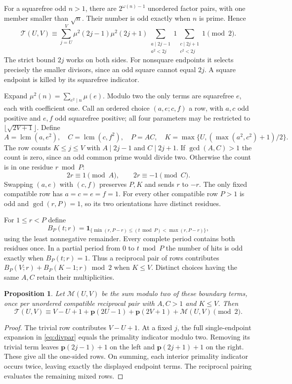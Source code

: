 \documentclass[11pt]{article}
\newtheorem{proposition}[theorem]{Proposition}
\begin{document}
For a squarefree odd $n>1$, there are $2^{\omega(n)-1}$ unordered
factor pairs, with one member smaller than $\sqrt n$.
Their number is odd exactly when $n$ is prime. Hence
\begin{equation}\label{eq:divpar}
 \mathcal T(U,V)\equiv\sum_{j=U}^V\mu^2(2j-1)\mu^2(2j+1)
 \sum_{\substack{a\mid 2j-1\\a^2<2j}}1
 \sum_{\substack{c\mid 2j+1\\c^2<2j}}1 \pmod2 .
\end{equation}
The strict bound $2j$ works on both sides. For nonsquare endpoints it
selects precisely the smaller divisors, since an odd square cannot
equal $2j$. A square endpoint is killed by its squarefree indicator.

Expand $\mu^2(n)=\sum_{e^2\mid n}\mu(e)$. Modulo two the only terms
are squarefree $e$, each with coefficient one. Call an ordered choice
$(a,e;c,f)$ a row, with $a,c$ odd positive and $e,f$ odd squarefree
positive; all four parameters may be restricted to
$\lfloor\sqrt{2V+1}\rfloor$. Define
\[
 A=\operatorname{lcm}(a,e^2),\quad C=\operatorname{lcm}(c,f^2),
 \quad P=AC,\quad K=\max\{U,(\max(a^2,c^2)+1)/2\}.
\]
The row counts $K\le j\le V$ with $A\mid 2j-1$ and $C\mid2j+1$.
If $\gcd(A,C)>1$ the count is zero, since an odd common prime would
divide two. Otherwise the count is in one residue $r\bmod P$:
\begin{equation}\label{eq:rowcrt}
   2r\equiv1\pmod A,\qquad 2r\equiv-1\pmod C.
\end{equation}
Swapping $(a,e)$ with $(c,f)$ preserves $P,K$ and sends $r$ to
$-r$. The only fixed compatible row has $a=c=e=f=1$. For every
other compatible row $P>1$ is odd and $\gcd(r,P)=1$, so its two
orientations have distinct residues.

For $1\le r<P$ define
\[
 B_P(t;r)=\mathbf1_{\{\min(r,P-r)\le (t\bmod P)<\max(r,P-r)\}},
\]
using the least nonnegative remainder. Every complete period contains
both residues once. In a partial period from $0$ to $t\bmod P$ the
number of hits is odd exactly when $B_P(t;r)=1$. Thus a reciprocal
pair of rows contributes $B_P(V;r)+B_P(K-1;r)\bmod2$ when $K\le V$.
Distinct choices having the same $A,C$ retain their multiplicities.

\begin{proposition}\label{prop:mixed}
Let $\mathcal M(U,V)$ be the sum modulo two of these boundary terms,
once per unordered compatible reciprocal pair with $A,C>1$ and
$K\le V$. Then
\[
 \mathcal T(U,V)\equiv V-U+1+
 \mathbf p(2U-1)+\mathbf p(2V+1)+\mathcal M(U,V)\pmod2 .
\]
\end{proposition}
\begin{proof}
The trivial row contributes $V-U+1$. At a fixed $j$, the full
single-endpoint expansion in \eqref{eq:divpar} equals the primality
indicator modulo two. Removing its trivial term leaves
$\mathbf p(2j-1)+1$ on the left and $\mathbf p(2j+1)+1$ on the right.
These give all the one-sided rows. On summing, each interior primality
indicator occurs twice, leaving exactly the displayed endpoint terms.
The reciprocal pairing evaluates the remaining mixed rows.
\end{proof}
\end{document}

